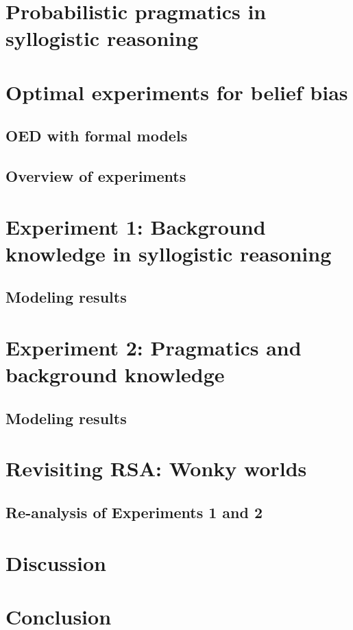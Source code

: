 \documentclass{llncs} %
\begin{document}
\section{Probabilistic pragmatics in syllogistic reasoning}




\section{Optimal experiments for belief bias}

\subsection{OED with formal models}

\subsection{Overview of experiments} 

\section{Experiment 1: Background knowledge in syllogistic reasoning}

\subsection{Modeling results}

\section{Experiment 2: Pragmatics and background knowledge}

\subsection{Modeling results}

\section{Revisiting RSA: Wonky worlds}

\subsection{Re-analysis of Experiments 1 and 2}

\section{Discussion}

\section{Conclusion}
\end{document}
